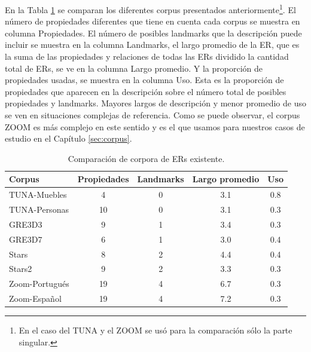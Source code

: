 En la Tabla \ref{tab-comparison-prop} se comparan los diferentes corpus presentados anteriormente\footnote{En el caso del TUNA y el ZOOM se us\'o para la comparaci\'on s\'olo la parte singular.}. El n\'umero de propiedades diferentes que tiene en cuenta cada corpus se muestra en columna Propiedades. El n\'umero de posibles landmarks que la descripci\'on puede incluir se muestra en la columna Landmarks, el largo promedio de la ER, que es la suma de las propiedades y relaciones de todas las ERs  dividido la cantidad total de ERs, se ve en la columna Largo promedio. Y la proporci\'on de propiedades usadas, se muestra en la columna Uso. Esta es la proporci\'on de propiedades que aparecen en la descripci\'on sobre el n\'umero total de posibles propiedades y landmarks. Mayores largos de descripci\'on y menor promedio de uso se ven en situaciones complejas de referencia. Como se puede observar, el corpus ZOOM es m\'as complejo en este sentido y es el que usamos para nuestros casos de estudio en el Cap\'itulo \ref{sec:corpus}.

\begin{table}[ht]
\begin{center}
\footnotesize{

\begin{tabular} {  l c c c c}
\hline
Corpus											&Propiedades			  & Landmarks			& Largo promedio	& Uso \\
\hline
TUNA-Muebles							  & 4								& 0							&	3.1				& 0.8   \\
TUNA-Personas								& 10							& 0							& 3.1				& 0.3   \\
GRE3D3											&	9								& 1							& 3.4				& 0.3   \\
GRE3D7											&	6								& 1							& 3.0				& 0.4   \\
Stars												&	8								& 2							& 4.4				& 0.4   \\
Stars2											& 9								& 2							& 3.3				& 0.3   \\
Zoom-Portugu\'es						& 19							& 4							& 6.7				& 0.3   \\
Zoom-Espa\~nol							& 19							& 4							& 7.2				& 0.3   \\
\hline
\end{tabular}
}
\end{center}
\caption{Comparaci\'on de corpora de ERs existente.}\label{tab-comparison-prop}
\end{table}

